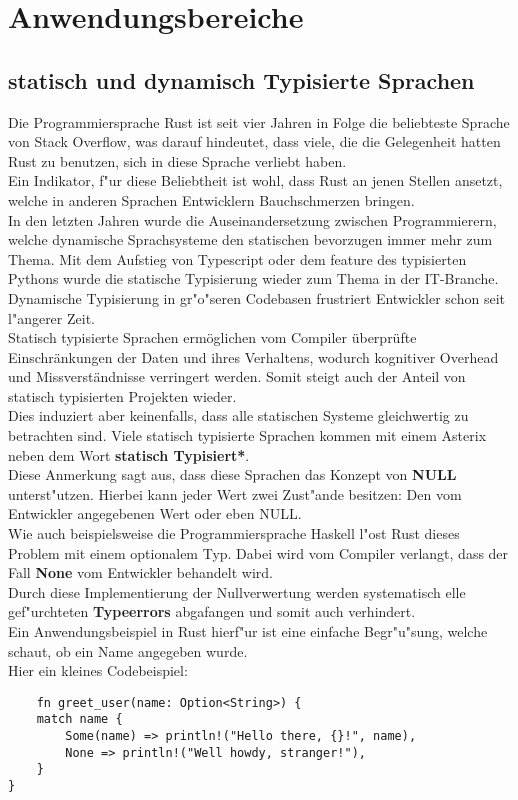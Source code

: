 \chapter{Anwendungsbereiche} %
\label{cha:Anwendungsbereiche}
\section{statisch und dynamisch Typisierte Sprachen}
Die Programmiersprache Rust ist seit vier Jahren in Folge die beliebteste Sprache von Stack Overflow, was darauf hindeutet, dass viele, die die Gelegenheit hatten Rust zu benutzen, sich in diese Sprache verliebt haben. \autocite{so-rust-loved}\\
Ein Indikator, f"ur diese Beliebtheit ist wohl, dass Rust an jenen Stellen ansetzt, welche in anderen Sprachen Entwicklern Bauchschmerzen bringen.\\
In den letzten Jahren wurde die Auseinandersetzung zwischen Programmierern, welche dynamische Sprachsysteme den statischen bevorzugen immer mehr zum Thema. Mit dem Aufstieg von Typescript oder dem feature des typisierten Pythons wurde die statische Typisierung wieder zum Thema in der IT-Branche.\\
Dynamische Typisierung in gr"o"seren Codebasen frustriert Entwickler schon seit l"angerer Zeit. \\
Statisch typisierte Sprachen ermöglichen vom Compiler überprüfte Einschränkungen der Daten und ihres Verhaltens, wodurch kognitiver Overhead und Missverständnisse verringert werden. Somit steigt auch der Anteil von statisch typisierten Projekten wieder. \\
Dies induziert aber keinenfalls, dass alle statischen Systeme gleichwertig zu betrachten sind. Viele statisch typisierte Sprachen kommen mit einem Asterix neben dem Wort \textbf{statisch Typisiert*}.\\
Diese Anmerkung sagt aus, dass diese Sprachen das Konzept von \textbf{NULL} unterst"utzen.
Hierbei kann jeder Wert zwei Zust"ande besitzen: Den vom Entwickler angegebenen Wert oder eben NULL. \\
Wie auch beispielsweise die Programmiersprache Haskell l"ost Rust dieses Problem mit einem optionalem Typ. Dabei wird vom Compiler verlangt, dass der Fall \textbf{None} vom Entwickler behandelt wird.\\
Durch diese Implementierung der Nullverwertung werden systematisch elle gef"urchteten \textbf{Typeerrors} abgafangen und somit auch verhindert.\\
Ein Anwendungsbeispiel in Rust hierf"ur ist eine einfache Begr"u"sung, welche schaut, ob ein Name angegeben wurde.\\
Hier ein kleines Codebeispiel:
\newpage
\begin{verbatim}
    fn greet_user(name: Option<String>) {
    match name {
        Some(name) => println!("Hello there, {}!", name),
        None => println!("Well howdy, stranger!"),
    }
}

 \end{verbatim}
\begin{lstlisting}[caption={Optionale Typisierung}, label={lst:optionaltypes}]
 \end{lstlisting}

